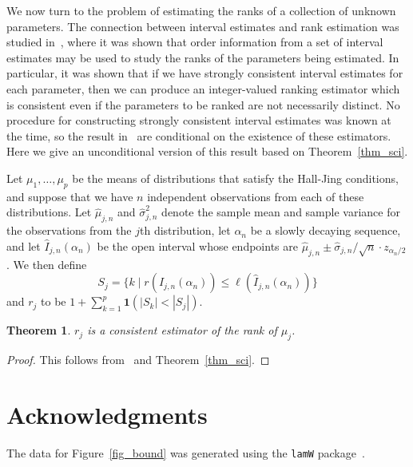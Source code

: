 \documentclass[12pt]{article}
\newcommand{\ind}[1]{\mathbf{1}(#1)}
\newtheorem{theorem}{Theorem}
\numberwithin{theorem}{section}
\begin{document}
We now turn to the problem of estimating the ranks of a collection of unknown parameters.  The connection between interval estimates and rank estimation was studied in~\cite{rising2023orderPersp}, where it was shown that order information from a set of interval estimates may be used to study the ranks of the parameters being estimated.  In particular, it was shown that if we have strongly consistent interval estimates for each parameter, then we can produce an integer-valued ranking estimator which is consistent even if the parameters to be ranked are not necessarily distinct.  No procedure for constructing strongly consistent interval estimates was known at the time, so the result in~\cite{rising2023orderPersp} are conditional on the existence of these estimators.  Here we give an unconditional version of this result based on Theorem~\ref{thm_sci}.

Let $\mu_1, \dots, \mu_p$ be the means of distributions that satisfy the Hall-Jing conditions, and suppose that we have $n$ independent observations from each of these distributions.  Let $\hat{\mu}_{j, n}$ and $\hat{\sigma}^2_{j, n}$ denote the sample mean and sample variance for the observations from the $j$th distribution, let $\alpha_n$ be a slowly decaying sequence, and let $\hat{I}_{j, n}(\alpha_n)$ be the open interval whose endpoints are $\hat{\mu}_{j, n} \pm \hat{\sigma}_{j, n} / \sqrt{n} \cdot z_{\alpha_n / 2}$.  We then define \[S_j = \{k \mid r(\hat{I}_{j, n}(\alpha_n)) \leq \ell(\hat{I}_{j, n}(\alpha_n))\}\] and $r_j$ to be $1 + \sum_{k = 1}^p \ind{|S_k| < |S_j|}$.

\begin{theorem}
\label{thm_ranks}
$r_j$ is a consistent estimator of the rank of $\mu_j$.
\end{theorem}
\begin{proof}
This follows from~\cite[Theorems 6.4 and 6.7]{rising2023orderPersp} and Theorem~\ref{thm_sci}.
\end{proof}

\section*{Acknowledgments}

The data for Figure~\ref{fig_bound} was generated using the \texttt{lamW} package~\citep{adler2015lambertPackage}.



\end{document}
